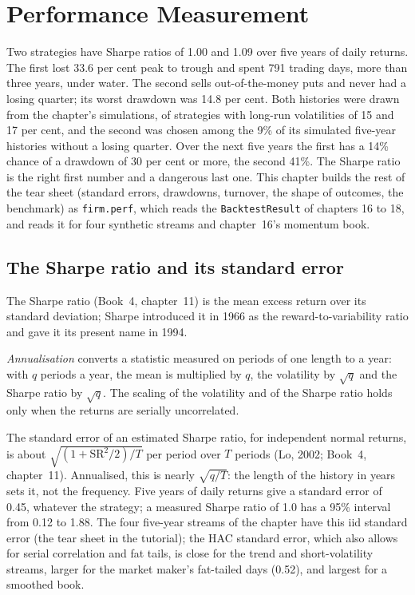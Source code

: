 \chapter{Performance Measurement}\label{ch:rs:performance-measurement}

Two strategies have Sharpe ratios of 1.00 and 1.09 over five years of daily returns. The first lost 33.6 per cent peak to trough and spent 791 trading
days, more than three years, under water. The second sells out-of-the-money puts and never had a losing quarter; its worst drawdown was 14.8 per cent.
Both histories were drawn from the chapter's simulations, of strategies with long-run volatilities of 15 and 17 per cent, and the second was chosen
among the 9\% of its simulated five-year histories without a losing quarter. Over the next five years the first has a 14\% chance of a drawdown of 30
per cent or more, the second 41\%. The Sharpe ratio is the right first number and a dangerous last one. This chapter builds the rest of the tear
sheet (standard errors, drawdowns, turnover, the shape of outcomes, the benchmark) as \texttt{firm.perf}, which reads the \texttt{BacktestResult} of
chapters 16 to 18, and reads it for four synthetic streams and chapter~16's momentum book.

\section{The Sharpe ratio and its standard error}

The Sharpe ratio (Book~4, chapter~11) is the mean excess return over its standard deviation; Sharpe introduced it in 1966 as the reward-to-variability
ratio and gave it its present name in 1994.

\begin{definition}[Annualisation]\label{def:rs:performance-measurement:annualisation}
\emph{Annualisation} converts a statistic measured on periods of one length to a year: with $q$ periods a year, the mean is multiplied by $q$,
the volatility by $\sqrt q$ and the Sharpe ratio by $\sqrt q$. The scaling of the volatility and of the Sharpe ratio holds only when the returns are
serially uncorrelated.
\end{definition}

The standard error of an estimated Sharpe ratio, for independent normal returns, is about $\sqrt{(1 + \mathrm{SR}^2/2)/T}$ per period over $T$ periods (Lo,
2002; Book~4, chapter~11). Annualised, this is nearly $\sqrt{q/T}$: the length of the history in years sets it, not the frequency. Five years of daily returns
give a standard error of 0.45, whatever the strategy; a measured Sharpe ratio of 1.0 has a 95\% interval from 0.12 to 1.88. The four five-year streams of the chapter
have this iid standard error (the tear sheet in the tutorial); the HAC standard error, which also allows for serial correlation and fat tails, is close for the
trend and short-volatility streams, larger for the market maker's fat-tailed days (0.52), and largest for a smoothed book.

